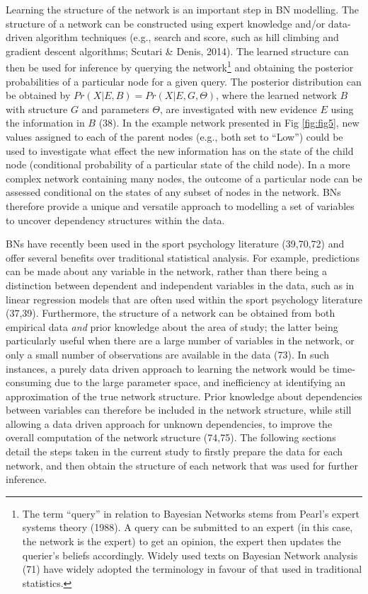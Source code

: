 \documentclass[
  english,
  man]{apa6}
\begin{document}
Learning the structure of the network is an important step in BN modelling. The structure of a network can be constructed using expert knowledge and/or data-driven algorithm techniques (e.g., search and score, such as hill climbing and gradient descent algorithms; Scutari \& Denis, 2014).
The learned structure can then be used for inference by querying the network\footnote{The term ``query'' in relation to Bayesian Networks stems from Pearl's expert systems theory (1988). A query can be submitted to an expert (in this case, the network is the expert) to get an opinion, the expert then updates the querier's beliefs accordingly. Widely used texts on Bayesian Network analysis (71) have widely adopted the terminology in favour of that used in traditional statistics.} and obtaining the posterior probabilities of a particular node for a given query.
The posterior distribution can be obtained by \(Pr(X|E,B) = Pr(X|E,G,\Theta)\), where the learned network \(B\) with structure \(G\) and parameters \(\Theta\), are investigated with new evidence \(E\) using the information in \(B\) (38).
In the example network presented in Fig \ref{fig:fig5}, new values assigned to each of the parent nodes (e.g., both set to ``Low'') could be used to investigate what effect the new information has on the state of the child node (conditional probability of a particular state of the child node).
In a more complex network containing many nodes, the outcome of a particular node can be assessed conditional on the states of any subset of nodes in the network.
BNs therefore provide a unique and versatile approach to modelling a set of variables to uncover dependency structures within the data.

BNs have recently been used in the sport psychology literature (39,70,72) and offer several benefits over traditional statistical analysis.
For example, predictions can be made about any variable in the network, rather than there being a distinction between dependent and independent variables in the data, such as in linear regression models that are often used within the sport psychology literature (37,39).
Furthermore, the structure of a network can be obtained from both empirical data \emph{and} prior knowledge about the area of study; the latter being particularly useful when there are a large number of variables in the network, or only a small number of observations are available in the data (73).
In such instances, a purely data driven approach to learning the network would be time-consuming due to the large parameter space, and inefficiency at identifying an approximation of the true network structure.
Prior knowledge about dependencies between variables can therefore be included in the network structure, while still allowing a data driven approach for unknown dependencies, to improve the overall computation of the network structure (74,75).
The following sections detail the steps taken in the current study to firstly prepare the data for each network, and then obtain the structure of each network that was used for further inference.
\end{document}
